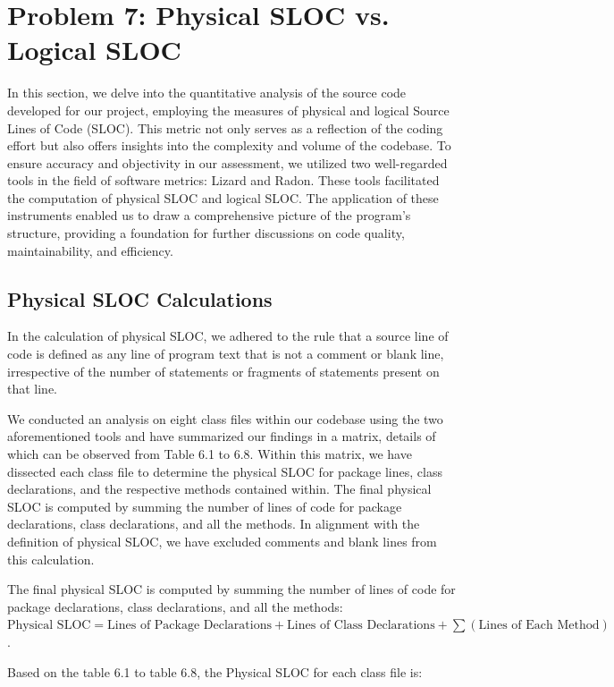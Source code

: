 \documentclass[english,12pt,a4paper]{report}
\begin{document}
	
	\chapter{Problem 7: Physical SLOC vs. Logical SLOC}
	In this section, we delve into the quantitative analysis of the source code developed for our project, employing the measures of physical and logical Source Lines of Code (SLOC). This metric not only serves as a reflection of the coding effort but also offers insights into the complexity and volume of the codebase. To ensure accuracy and objectivity in our assessment, we utilized two well-regarded tools in the field of software metrics: Lizard and Radon. These tools facilitated the computation of physical SLOC and logical SLOC. The application of these instruments enabled us to draw a comprehensive picture of the program’s structure, providing a foundation for further discussions on code quality, maintainability, and efficiency.
	\section{Physical SLOC Calculations}
	In the calculation of physical SLOC, we adhered to the rule that a source line of code is defined as any line of program text that is not a comment or blank line, irrespective of the number of statements or fragments of statements present on that line.
	
	\vspace{10pt}
	We conducted an analysis on eight class files within our codebase using the two aforementioned tools and have summarized our findings in a matrix, details of which can be observed from Table 6.1 to 6.8. Within this matrix, we have dissected each class file to determine the physical SLOC for package lines, class declarations, and the respective methods contained within. The final physical SLOC is computed by summing the number of lines of code for package declarations, class declarations, and all the methods. In alignment with the definition of physical SLOC, we have excluded comments and blank lines from this calculation.
	
	\vspace{10pt}
	The final physical SLOC is computed by summing the number of lines of code for package declarations, class declarations, and all the methods: \( \text{Physical SLOC} = \text{Lines of Package Declarations} + \text{Lines of Class Declarations} + \sum (\text{Lines of Each Method}) \).
	
	\vspace{10pt}
	Based on the table 6.1 to table 6.8, the Physical SLOC for each class file is:
	
\end{document}
